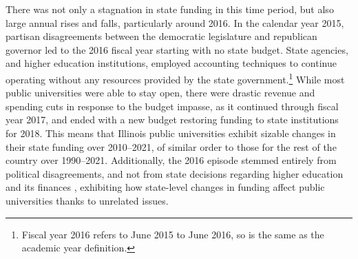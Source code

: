 
There was not only a stagnation in state funding in this time period, but also large annual rises and falls, particularly around 2016.
In the calendar year 2015, partisan disagreements between the democratic legislature and republican governor led to the 2016 fiscal year starting with no state budget.
State agencies, and higher education institutions, employed accounting techniques to continue operating without any resources provided by the state government.\footnote{
    Fiscal year 2016 refers to June 2015 to June 2016, so is the same as the academic year definition.
}
While most public universities were able to stay open, there were drastic revenue and spending cuts in response to the budget impasse, as it continued through fiscal year 2017, and ended with a new budget restoring funding to state institutions for 2018.
This means that Illinois public universities exhibit sizable changes in their state funding over 2010--2021, of similar order to those for the rest of the country over 1990--2021.
Additionally, the 2016 episode stemmed entirely from political disagreements, and not from state decisions regarding higher education and its finances \citep{young2020squandered}, exhibiting how state-level changes in funding affect public universities thanks to unrelated issues. 

